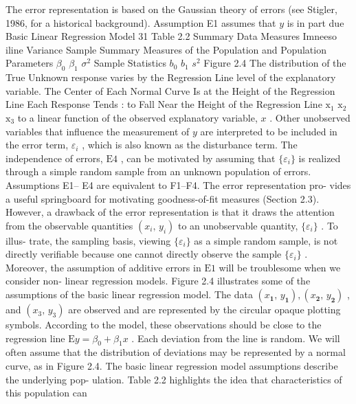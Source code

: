 \documentclass[11pt]{article}
\begin{document}
 The error representation is based on the Gaussian theory of errors (see Stigler,
1986, for a historical background). Assumption E1 assumes that \(y\) is in part due
 Basic Linear Regression Model 31
Table 2.2 Summary
Data Measures Imneeso iline Variance Sample
 Summary Measures of the
 Population and
 Population Parameters \(\beta_{0}\) \(\beta_{1}\) \(\sigma^{2}\)
Sample Statistics \(b_{0}\) \(b_{1}\) \(s^{2}\)
Figure 2.4 The
distribution of the
True Unknown response varies by the
 Regression Line level of the
 explanatory variable.
The Center of Each Normal
Curve Is at the Height of
 the Regression Line
Each Response Tends
: to Fall Near the Height of
 the Regression Line
\(\mathrm{x_{1}}\) \(\mathrm{x_{2}}\) \(\mathrm{x_{3}}\)
 to a linear function of the observed explanatory variable, \(x\) . Other unobserved
 variables that influence the measurement of \(y\) are interpreted to be included in the
error term, \(\varepsilon_{i}\) , which is also known as the disturbance term. The independence of
errors, \(\mathrm{E 4}\) , can be motivated by assuming that \(\{\varepsilon_{i} \}\) is realized through a simple
 random sample from an unknown population of errors.
 Assumptions E1-- E4 are equivalent to F1--F4. The error representation pro-
 vides a useful springboard for motivating goodness-of-fit measures (Section 2.3).
However, a drawback of the error representation is that it draws the attention
 from the observable quantities \(( x_{i} , \, y_{i} )\) to an unobservable quantity, \(\{\varepsilon_{i} \}\) . To illus-
trate, the sampling basis, viewing \(\{\varepsilon_{i} \}\) as a simple random sample, is not directly
verifiable because one cannot directly observe the sample \(\{\varepsilon_{i} \}\) . Moreover, the
 assumption of additive errors in \(\mathrm{E 1}\) will be troublesome when we consider non-
 linear regression models.
Figure 2.4 illustrates some of the assumptions of the basic linear regression
 model. The data \(( x_{\boldsymbol{1}} , \, y_{\boldsymbol{1}} ) , ( x_{\boldsymbol{2}} , \, y_{\boldsymbol{2}} )\) , and \(( x_{3} , \, y_{3} )\) are observed and are represented by
 the circular opaque plotting symbols. According to the model, these observations
should be close to the regression line \(\textrm{E} y=\beta_{0}+\beta_{1} x\) . Each deviation from the
 line is random. We will often assume that the distribution of deviations may be
represented by a normal curve, as in Figure 2.4.
 The basic linear regression model assumptions describe the underlying pop-
 ulation. Table 2.2 highlights the idea that characteristics of this population can
\end{document}
